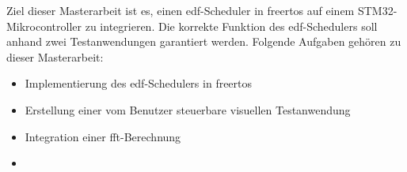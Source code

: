 \documentclass[../EDF Master Thesis.tex]{subfiles}
\begin{document}
    Ziel dieser Masterarbeit ist es, einen \ac{edf}-Scheduler in \ac{freertos} auf einem STM32-Mikrocontroller zu integrieren.
    Die korrekte Funktion des \ac{edf}-Schedulers soll anhand zwei Testanwendungen garantiert werden.
    Folgende Aufgaben gehören zu dieser Masterarbeit:
    \begin{itemize}
        \item Implementierung des \ac{edf}-Schedulers in \ac{freertos}
        \item Erstellung einer vom Benutzer steuerbare visuellen Testanwendung
        \item Integration einer \ac{fft}-Berechnung
        \item 
    \end{itemize}
\end{document}
